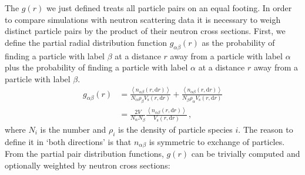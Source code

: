 The $g(r)$ we just defined treats all particle pairs on an equal footing. In order to compare simulations with neutron scattering data it is necessary to weigh distinct particle pairs by the product of their neutron cross sections. First, we define the partial radial distribution function $g_{\alpha\beta}(r)$ as the probability of finding a particle with label $\beta$ at a distance $r$ away from a particle with label $\alpha$ plus the probability of finding a particle with label $\alpha$ at a distance $r$ away from a particle with label $\beta$.
%
\begin{align*}
g_{\alpha\beta}(r) &= \frac{ \left\langle n_{\alpha\beta}(r,\mathrm{d}r) \right\rangle}{N_\alpha  \rho_\beta V_\text{s}(r,\mathrm{d}r)} + \frac{ \left\langle n_{\alpha\beta}(r,\mathrm{d}r) \right\rangle}{N_\beta \rho_\alpha V_\text{s}(r,\mathrm{d}r)} \\
&= \frac{2V}{N_\alpha N_\beta} \frac{ \left\langle n_{\alpha\beta}(r,\mathrm{d}r) \right\rangle}{V_\text{s}(r,\mathrm{d}r)} \, ,
\end{align*}
%
where $N_i$ is the number and $\rho_i$ is the density of particle species $i$. The reason to define it in `both directions' is that $n_{\alpha\beta}$ is symmetric to exchange of particles. From the partial pair distribution functions, $g(r)$ can be trivially computed and optionally weighted by neutron cross sections:
%

